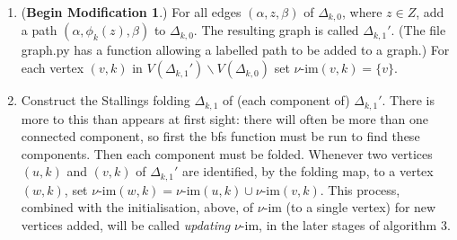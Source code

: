 \documentclass[a4paper,12pt]{article}
\renewcommand{\a}{\alpha }
\renewcommand{\b}{\beta }
\newcommand{\D}{\Delta }
\newcommand{\vim}{\nu\textrm{-im}}
\numberwithin{equation}{section}
\numberwithin{figure}{section}
\newcommand{\be}{\begin{enumerate}}
\newcommand{\ee}{\end{enumerate}}
\begin{document}
\be[{D}1]
\addtocounter{enumi}{1}
\item\label{it:D2} (\textbf{Begin Modification 1}.)  For all edges
$(\a,z,\b)$ of $\D_{k,0}$, where $z\in Z$, add a path  $(\a,\phi_k(z),\b)$ to
$\D_{k,0}$. The resulting graph is called $\D_{k,1}'$. (The file
graph.py has a function allowing a labelled path to be added to a graph.) 
For each vertex $(v,k)$ in $V(\D_{k,1}')\backslash V(\D_{k,0})$ set  
$\vim(v,k)=\{v\}$. 
\item\label{it:D3}  Construct the Stallings folding $\D_{k,1}$  of (each component of)
$\D_{k,1}'$.  There is more to this than appears at first sight: there
 will often be more than one connected component, so first the bfs
function must be run to find these components. Then each component must
be folded.   
Whenever two  vertices $(u,k)$ and $(v,k)$
of $\D_{k,1}'$ are identified, by the folding map, to a vertex $(w,k)$, 
set $\vim(w,k)=\vim(u,k)\cup \vim(v,k)$.  This process, combined 
with the initialisation, above, of  $\vim$ (to a single vertex) for new vertices
added,  will be 
called \emph{updating} 
$\vim$, in the later stages of algorithm 3. 
\ee
\end{document}
